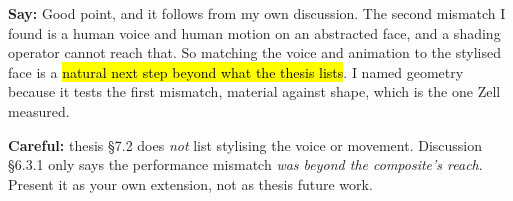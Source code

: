 \documentclass[11pt,a4paper]{article}
\newcommand{\key}[1]{\hl{#1}}
\newcommand{\say}[1]{\begin{tcolorbox}[colback=knlight,colframe=knblue,boxrule=0.5pt,left=6pt,right=6pt,top=4pt,bottom=4pt]\textbf{Say:} #1\end{tcolorbox}}
\newcommand{\careful}[1]{{\color{knred}\textbf{Careful:} #1}\par}
\begin{document}
\say{Good point, and it follows from my own discussion. The second mismatch I found is a human voice and human motion on an abstracted face, and a shading operator cannot reach that. So matching the voice and animation to the stylised face is a \key{natural next step beyond what the thesis lists}. I named geometry because it tests the first mismatch, material against shape, which is the one Zell measured.}

\careful{thesis §7.2 does \emph{not} list stylising the voice or movement. Discussion §6.3.1 only says the performance mismatch \emph{was beyond the composite's reach}. Present it as your own extension, not as thesis future work.}
\end{document}
